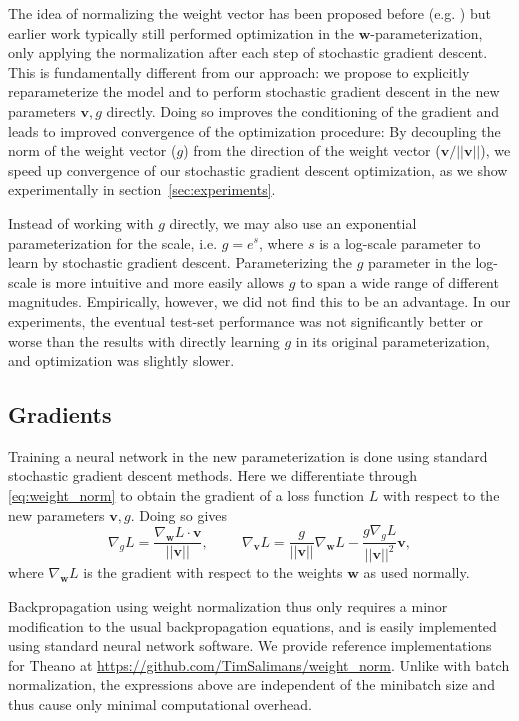 \documentclass{article}
\newcommand{\bv}{\mathbf{v}}
\newcommand{\bw}{\mathbf{w}}
\begin{document}
The idea of normalizing the weight vector has been proposed before (e.g. \cite{max_norm}) but earlier work typically still performed optimization in the $\bw$-parameterization, only applying the normalization after each step of stochastic gradient descent. This is fundamentally different from our approach: we propose to explicitly reparameterize the model and to perform stochastic gradient descent in the new parameters $\bv,g$ directly. Doing so improves the conditioning of the gradient and leads to improved convergence of the optimization procedure: By decoupling the norm of the weight vector ($g$) from the direction of the weight vector ($\bv/||\bv||$), we speed up convergence of our stochastic gradient descent optimization, as we show experimentally in section~\ref{sec:experiments}.

Instead of working with $g$ directly, we may also use an exponential parameterization for the scale, i.e. $g = e^{s}$, where $s$ is a log-scale parameter to learn by stochastic gradient descent. Parameterizing the $g$ parameter in the log-scale is more intuitive and more easily allows $g$ to span a wide range of different magnitudes. Empirically, however, we did not find this to be an advantage. In our experiments, the eventual test-set performance was not significantly better or worse than the results with directly learning $g$ in its original parameterization, and optimization was slightly slower.

\subsection{Gradients}
Training a neural network in the new parameterization is done using standard stochastic gradient descent methods. Here we differentiate through \eqref{eq:weight_norm} to obtain the gradient of a loss function $L$ with respect to the new parameters $\bv, g$. Doing so gives
\begin{equation}
\nabla_{g}L = \frac{\nabla_{\bw}L \cdot \bv}{||\bv||}, \hspace{1cm} \nabla_{\bv}L = \frac{g}{||\bv||}\nabla_{\bw}L - \frac{g \nabla_{g}L}{||\bv||^{2}} \bv,\label{eq:wn_grad0}
\end{equation}
where $\nabla_{\bw}L$ is the gradient with respect to the weights $\bw$ as used normally.

Backpropagation using weight normalization thus only requires a minor modification to the usual backpropagation equations, and is easily implemented using standard neural network software. We provide reference implementations for Theano at \url{https://github.com/TimSalimans/weight_norm}. Unlike with batch normalization, the expressions above are independent of the minibatch size and thus cause only minimal computational overhead.
\end{document}
